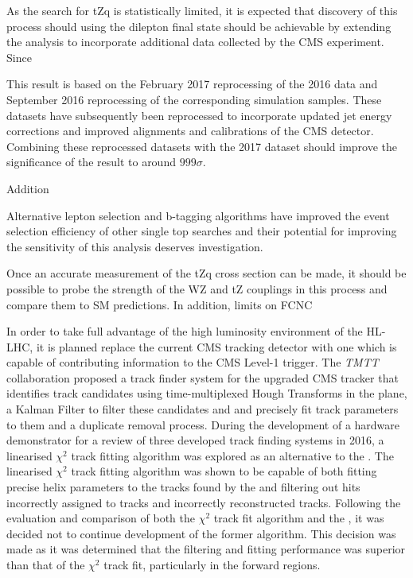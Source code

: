 As the search for tZq is statistically limited, it is expected that discovery of this process should using the dilepton final state should be achievable by extending the analysis to incorporate additional data collected by the CMS experiment.
Since

This result is based on the February 2017 reprocessing of the 2016 data and September 2016 reprocessing of the corresponding simulation samples.
These datasets have subsequently been reprocessed to incorporate updated jet energy corrections and improved alignments and calibrations of the CMS detector.
Combining these reprocessed datasets with the 2017 dataset should improve the significance of the result to around $999\sigma$.

Addition

Alternative lepton selection and b-tagging algorithms have improved the event selection efficiency of other single top searches and their potential for improving the sensitivity of this analysis deserves investigation.

Once an accurate measurement of the tZq cross section can be made, it should be possible to probe  the strength of the WZ and tZ couplings in this process and compare them to SM predictions.
In addition, limits on FCNC

In order to take full advantage of the high luminosity environment of the HL-LHC, it is planned replace the current CMS tracking detector with one which is capable of contributing information to the CMS Level-1 trigger.
The \emph{TMTT} collaboration proposed a track finder system for the upgraded CMS tracker that identifies track candidates using time-multiplexed Hough Transforms in the \rphi plane, a Kalman Filter to filter these candidates and and precisely fit track parameters to them and a duplicate removal process.
During the development of a hardware demonstrator for a review of three developed track finding systems in 2016, a linearised $\chi^{2}$ track fitting algorithm was explored as an alternative to the \KF.
The linearised $\chi^{2}$ track fitting algorithm was shown to be capable of both fitting precise helix parameters to the tracks found by the \HT and filtering out hits incorrectly assigned to tracks and incorrectly reconstructed tracks.
Following the evaluation and comparison of both the $\chi^{2}$ track fit algorithm and the \KF, it was decided not to continue development of the former algorithm.
This decision was made as it was determined that the \KF filtering and fitting performance was superior than that of the $\chi^{2}$ track fit, particularly in the forward regions.

